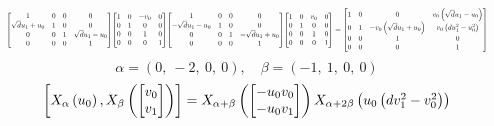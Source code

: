 \documentclass[11pt]{article}
\theoremstyle{definition}
\begin{document}
\[
\scaletoalign{\textwidth}{{\left[\begin{matrix}1 & 0 & 0 & 0\\\sqrt{d} u_{1} + u_{0} & 1 & 0 & 0\\0 & 0 & 1 & \sqrt{d} u_{1} - u_{0}\\0 & 0 & 0 & 1\end{matrix}\right]} {\left[\begin{matrix}1 & 0 & - v_{0} & 0\\0 & 1 & 0 & 0\\0 & 0 & 1 & 0\\0 & 0 & 0 & 1\end{matrix}\right]} {\left[\begin{matrix}1 & 0 & 0 & 0\\- \sqrt{d} u_{1} - u_{0} & 1 & 0 & 0\\0 & 0 & 1 & - \sqrt{d} u_{1} + u_{0}\\0 & 0 & 0 & 1\end{matrix}\right]} {\left[\begin{matrix}1 & 0 & v_{0} & 0\\0 & 1 & 0 & 0\\0 & 0 & 1 & 0\\0 & 0 & 0 & 1\end{matrix}\right]} = {\left[\begin{matrix}1 & 0 & 0 & v_{0} \left(\sqrt{d} u_{1} - u_{0}\right)\\0 & 1 & - v_{0} \left(\sqrt{d} u_{1} + u_{0}\right) & v_{0} \left(d u_{1}^{2} - u_{0}^{2}\right)\\0 & 0 & 1 & 0\\0 & 0 & 0 & 1\end{matrix}\right]}}
\]
\[
\alpha = \left( 0, \  -2, \  0, \  0\right), \quad \beta = \left( -1, \  1, \  0, \  0\right)
\]
\[
\scaletoalign{\textwidth}{\left[ X_{\alpha}\left(u_{0}\right), X_{\beta}\left(\left[\begin{matrix}v_{0}\\v_{1}\end{matrix}\right]\right) \right] = X_{\alpha + \beta}\left(\left[\begin{matrix}- u_{0} v_{0}\\- u_{0} v_{1}\end{matrix}\right]\right) X_{\alpha + 2\beta}\left(u_{0} \left(d v_{1}^{2} - v_{0}^{2}\right)\right)}
\]
\end{document}
